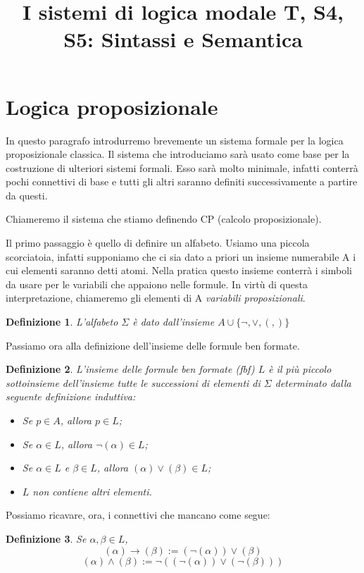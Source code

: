 \documentclass[a4paper, 12pt]{article}
\title{I sistemi di logica modale T, S4, S5: Sintassi e Semantica}
\newtheorem{definition}{Definizione}
\begin{document}
\maketitle
\section{Logica proposizionale}
In questo paragrafo introdurremo brevemente un sistema formale per la logica proposizionale classica.
Il sistema che introduciamo sarà usato come base per la costruzione di ulteriori sistemi formali.
Esso sarà molto minimale, infatti conterrà pochi connettivi di base
e tutti gli altri saranno definiti successivamente a partire da questi.

Chiameremo il sistema che stiamo definendo CP (calcolo proposizionale).

Il primo passaggio è quello di definire un alfabeto. Usiamo una piccola scorciatoia,
infatti supponiamo che ci sia dato a priori un insieme numerabile A i cui elementi saranno detti atomi.
Nella pratica questo insieme conterrà i simboli da usare per le variabili che appaiono nelle formule.
In virtù di questa interpretazione, chiameremo gli elementi di A \textit{variabili proposizionali}.

\begin{definition}
L'alfabeto $\Sigma$ è dato dall'insieme $A \cup \{\neg, \vee, (, ) \}$
\end{definition}

Passiamo ora alla definizione dell'insieme delle formule ben formate.

\begin{definition}
L'insieme delle formule ben formate (fbf) $L$ è il più piccolo sottoinsieme dell'insieme tutte le successioni
di elementi di $\Sigma$ determinato dalla seguente definizione induttiva:
\begin{itemize}
\item Se $p \in A$, allora $p \in L$;
\item Se $\alpha \in L$, allora $\neg (\alpha) \in L$;
\item Se $\alpha \in L$ e $\beta \in L$, allora $(\alpha) \vee (\beta) \in L$;
\item $L$ non contiene altri elementi.
\end{itemize}
\end{definition}

Possiamo ricavare, ora, i connettivi che mancano come segue:
\begin{definition}
Se $\alpha, \beta \in L$,
$$(\alpha) \rightarrow (\beta) := (\neg (\alpha)) \vee (\beta)$$
$$(\alpha) \wedge (\beta) := \neg ((\neg (\alpha)) \vee (\neg (\beta)))$$
\end{definition}
\end{document}
